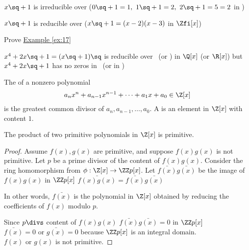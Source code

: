 \documentclass[a4paper]{article}
\begin{document}
\begin{example} \label{ex:17}
  \( x\sq + 1 \) is irreducible over \Zth \qpmi (\( 0\sq+1=1,\ 1\sq+1 = 2,\ 2\sq + 1 = 5 = 2 \) in \Zth)

  \( x\sq + 1 \) is reducible over \Zfi \qpmi (\( x\sq+1 = (x-2)(x-3) \) in \( \Zfi[x] \))
\end{example}

\begin{exercise}
  Prove \hyperref[ex:17]{Example \ref*{ex:17}}
\end{exercise}
\begin{example}
  \( x^4+2x\sq + 1 = (x\sq + 1)\sq \) is reducible over \Q\ (or \R) in \( \Q[x] \) (or \( \R[x] \)) but \( x^4+2x\sq + 1 \) has no zeros in \Q\ (or in \R)
\end{example}

\begin{definition}
The  of a nonzero polynomial \begin{align*}
  a_nx^n + a_{n-1}x^{n-1} + \cdots + a_1x+a_0 \in \Z[x]
\end{align*} is the greatest common divisor of \( a_n, a_{n-1}, \ldots, a_0 \).
A  is an element in \( \Z[x] \) with content \( 1 \).
\end{definition}

\begin{lemma}
  The product of two primitive polynomials in \( \Z[x] \) is primitive.
\end{lemma}

\begin{proof}
  Assume \( f(x),g(x) \) are primitive, and suppose \( f(x)g(x) \) is not primitive.
  Let \( p \) be a prime divisor of the content of \( f(x)g(x) \).
  Consider the ring homomorphism from \( \phi:\Z[x]\to \ZZ p[x] \).
  Let \( \bar{f(x)} \bar{g(x)} \) be the image of \( f(x)g(x)  \) in \( \ZZ p[x] \) \imp \( \bar{f(x)g(x)} = \bar{f(x)}\bar{g(x)} \)
  \begin{note}
    In other words, \( \bar{f(x)} \) is the polynomial in \( \Z[x] \) obtained by reducing the coefficients of \( f(x) \) modulo \( p \).
  \end{note}
  Since \( p\divs\) content of \( f(x)g(x) \) \imp \( \bar{f(x)}\bar{g(x)}=0 \) in \( \ZZ p[x] \)\\
  \imp \( \bar{f(x)} = 0 \) or \( \bar{g(x)} = 0 \) because \( \ZZ p[x] \) is an integral domain. \\
  \imp \( f(x) \) or \( g(x) \) is not primitive. \contradiction
\end{proof}
\end{document}
